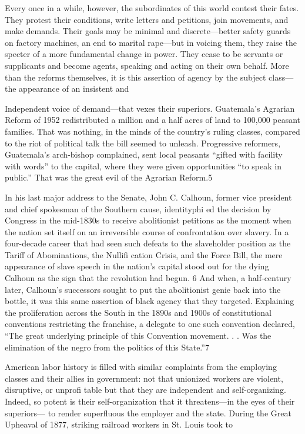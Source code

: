  \par 
Every once in a while, however, the subordinates of this world contest their fates. They protest their conditions, write letters and petitions, join movements, and make demands. Their goals may be minimal and discrete—better safety guards on factory machines, an end to marital rape—but in voicing them, they raise the specter of a more fundamental change in power. They cease to be servants or supplicants and become agents, speaking and acting on their own behalf. More than the reforms themselves, it is this assertion of agency by the subject class—the appearance of an insistent and
 \par 
Independent voice of demand—that vexes their superiors. Guatemala’s Agrarian Reform of 1952 redistributed a million and a half acres of land to 100,000 peasant families. That was nothing, in the minds of the country’s ruling classes, compared to the riot of political talk the bill seemed to unleash. Progressive reformers, Guatemala’s arch-bishop complained, sent local peasants “gifted with facility with words” to the capital, where they were given opportunities “to speak in public.” That was the great evil of the Agrarian Reform.{\color{blue}5}
 \par 
In his last major address to the Senate, John C. Calhoun, former vice president and chief spokesman of the Southern cause, identityphi ed the decision by Congress in the mid-1830s to receive abolitionist petitions as the moment when the nation set itself on an irreversible course of confrontation over slavery. In a four-decade career that had seen such defeats to the slaveholder position as the Tariff of Abominations, the Nullifi cation Crisis, and the Force Bill, the mere appearance of slave speech in the nation’s capital stood out for the dying Calhoun as the sign that the revolution had begun. {\color{blue}6} And when, a half-century later, Calhoun’s successors sought to put the abolitionist genie back into the bottle, it was this same assertion of black agency that they targeted. Explaining the proliferation across the South in the 1890s and 1900s of constitutional conventions restricting the franchise, a delegate to one such convention declared, “The great underlying principle of this Convention movement. . . Was the elimination of the negro from the politics of this State.”{\color{blue}7}
 \par 
American labor history is filled with similar complaints from the employing classes and their allies in government: not that unionized workers are violent, disruptive, or unprofi table but that they are independent and self-organizing. Indeed, so potent is their self-organization that it threatens—in the eyes of their superiors— to render superfluous the employer and the state. During the Great Upheaval of 1877, striking railroad workers in St. Louis took to
